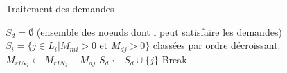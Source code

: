 \documentclass[10pt, c]{beamer}
\begin{document}
        	 \begin{frame}{Traitement des demandes}
                \begin{algorithm}[H]
                    \caption{Traitement des demandes}
                    \begin{algorithmic}
                        \STATE   $S_d = \emptyset$ (ensemble des noeuds dont i peut satisfaire les demandes)
                        \STATE $S_{i} = \{ j \in L_i | M_{mi} >0$ et $M_{dj} > 0 \} $ classées par ordre décroissant.
                                \STATE $ M_{rIN_{i}} \leftarrow M_{rIN_{i}} - M_{dj}$
                                \STATE $ S_d \leftarrow S_d \cup \{j\}$
                            \ELSE 
                                \STATE Break
                            \ENDIF
                        \ENDFOR
                    \end{algorithmic}
                \end{algorithm}
            \end{frame}
\end{document}
